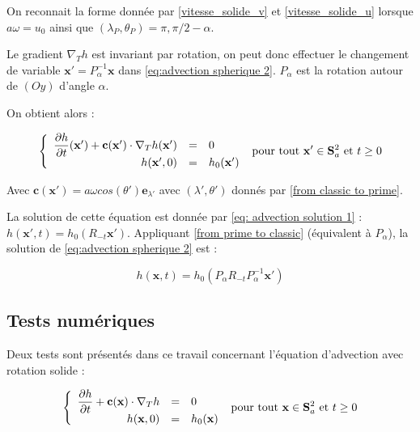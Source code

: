 On reconnait la forme donnée par \eqref{vitesse_solide_v} et \eqref{vitesse_solide_u} lorsque $a \omega = u_0$ ainsi que $(\lambda_P, \theta_P) = \pi, \pi/2 - \alpha$. 

Le gradient $\nabla_T h$ est invariant par rotation, on peut donc effectuer le changement de variable $\mathbf{x}' = P_{\alpha}^{-1} \mathbf{x}$ dans \eqref{eq:advection spherique 2}. $P_{\alpha}$ est la rotation autour de $(Oy)$ d'angle $\alpha$.

On obtient alors :

\begin{equation}
\left\lbrace
\begin{array}{r cl}
\dfrac{\partial h}{\partial t}( \mathbf{x}' ) + \mathbf{c} ( \mathbf{x}' ) \cdot \nabla_ T h( \mathbf{x}' ) & = & 0 \\
h(\mathbf{x}',0) & = & h_0 ( \mathbf{x}' )
\end{array}
\right. \text{ pour tout } \mathbf{x}' \in \mathbf{S}_a^2 \text{ et } t \geq 0
\end{equation}

Avec $\mathbf{c} ( \mathbf{x}' ) = a \omega cos ( \theta' ) \mathbf{e}_{\lambda'}$ avec $(\lambda', \theta')$ donnés par \eqref{from classic to prime}.

La solution de cette équation est donnée par \eqref{eq: advection solution 1} : $h( \mathbf{x}', t )= h_0(  R_{-t} \mathbf{x}') $. Appliquant \eqref{from prime to classic} (équivalent à $P_{\alpha}$), la solution de \eqref{eq:advection spherique 2} est :

\begin{equation}
\label{eq: advection solution 2}
h( \mathbf{x}, t ) = h_0(  P_{\alpha} R_{-t} P_{\alpha}^{-1} \mathbf{x}')
\end{equation}


\subsection{Tests numériques}

Deux tests sont présentés dans ce travail concernant l'équation d'advection avec rotation solide :

\begin{equation}
\label{eq:advection spherique 3}
\left\lbrace
\begin{array}{r cl}
\dfrac{\partial h}{\partial t} + \mathbf{c} ( \mathbf{x} ) \cdot \nabla_ T h & = & 0 \\
h(\mathbf{x},0) & = & h_0 ( \mathbf{x} )
\end{array}
\right. \text{ pour tout } \mathbf{x} \in \mathbf{S}_a^2 \text{ et } t \geq 0
\end{equation}

